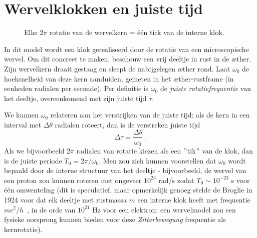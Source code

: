 \section{Wervelklokken en juiste tijd}

\begin{figure}[H]
    \centering
    \caption{Elke $2\pi$ rotatie van de wervelkern = één tick van de interne klok.}
    \label{fig:wervelklok}
\end{figure}

In dit model wordt een klok gerealiseerd door de rotatie van een microscopische wervel. Om dit concreet te maken, beschouw een vrij deeltje in rust in de æther. Zijn wervelkern draait gestaag en sleept de nabijgelegen æther rond. Laat $\omega_0$ de hoeksnelheid van deze kern  aanduiden, gemeten in het æther-rustframe (in eenheden radialen per seconde). Per definitie is $\omega_0$ de \emph{juiste rotatiefrequentie} van het deeltje, overeenkomend met zijn juiste tijd $\tau$.

We kunnen $\omega_0$ relateren aan het verstrijken van de juiste tijd: als de kern in een interval met $\Delta \theta$ radialen roteert, dan is de verstreken juiste tijd
\[
    \Delta \tau = \frac{\Delta \theta}{\omega_0} \,.
\]
Als we bijvoorbeeld $2\pi$ radialen van rotatie kiezen als een \("\)tik\("\) van de klok, dan is de juiste periode $T_0 = 2\pi/\omega_0$. Men zou zich kunnen voorstellen dat $\omega_0$ wordt bepaald door de interne structuur van het deeltje - bijvoorbeeld, de wervel van een proton zou kunnen roteren met ongeveer $10^{23}$ rad/s zodat $T_0 \sim 10^{-23}$ s voor één omwenteling (dit is speculatief, maar opmerkelijk genoeg stelde de Broglie in 1924 voor dat elk deeltje met rustmassa $m$ een interne klok heeft met frequentie $mc^2/h$~\cite{deBroglie1924-frequency}, in de orde van $10^{21}$ Hz voor een elektron; een wervelmodel zou een fysieke oorsprong kunnen bieden voor deze \emph{Zitterbewegung} frequentie als kernrotatie).

